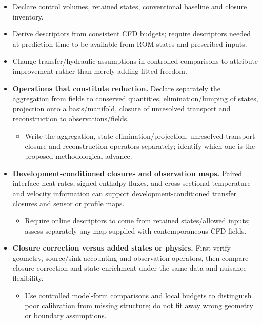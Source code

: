 \begin{itemize}[leftmargin=*]
\item Declare control volumes, retained states, conventional baseline and closure inventory.
\item Derive descriptors from consistent CFD budgets; require descriptors needed at prediction time to be available from ROM states and prescribed inputs.
\item Change transfer/\allowbreak{}hydraulic assumptions in controlled comparisons to attribute improvement rather than merely adding fitted freedom.

\item {}\textbf{Operations that constitute reduction.} Declare separately the aggregation from fields to conserved quantities, elimination/\allowbreak{}lumping of states, projection onto a basis/\allowbreak{}manifold, closure of unresolved transport and reconstruction to observations/\allowbreak{}fields.
\begin{itemize}
\item Write the aggregation, state elimination/\allowbreak{}projection, unresolved-transport closure and reconstruction operators separately; identify which one is the proposed methodological advance.
\end{itemize}
\item {}\textbf{Development-conditioned closures and observation maps.} Paired interface heat rates, signed enthalpy fluxes, and cross-sectional temperature and velocity information can support development-conditioned transfer closures and sensor or profile maps.
\begin{itemize}
\item Require online descriptors to come from retained states/\allowbreak{}allowed inputs; assess separately any map supplied with contemporaneous CFD fields.
\end{itemize}
\item {}\textbf{Closure correction versus added states or physics.} First verify geometry, source/\allowbreak{}sink accounting and observation operators, then compare closure correction and state enrichment under the same data and nuisance flexibility.
\begin{itemize}
\item Use controlled model-form comparisons and local budgets to distinguish poor calibration from missing structure; do not fit away wrong geometry or boundary assumptions.

\end{itemize}
\end{itemize}
